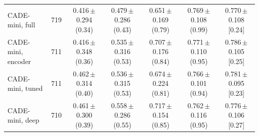 \begin{table}[t]
{\begin{tabular}{@{}lrccccc@{}}
    \midrule
    CADE-mini, full & 719 & 0.416\,{\scriptsize$\pm$0.294} {\scriptsize(0.34)} & 0.479\,{\scriptsize$\pm$0.286} {\scriptsize(0.43)} & 0.651\,{\scriptsize$\pm$0.169} {\scriptsize(0.79)} & 0.769\,{\scriptsize$\pm$0.108} {\scriptsize(0.99)} & 0.770\,{\scriptsize$\pm$0.108} {\scriptsize[0.24]} \\
    CADE-mini, encoder & 711 & 0.416\,{\scriptsize$\pm$0.348} {\scriptsize(0.36)} & 0.535\,{\scriptsize$\pm$0.316} {\scriptsize(0.53)} & 0.707\,{\scriptsize$\pm$0.176} {\scriptsize(0.84)} & 0.771\,{\scriptsize$\pm$0.110} {\scriptsize(0.95)} & 0.786\,{\scriptsize$\pm$0.105} {\scriptsize[0.25]} \\
    CADE-mini, tuned & 711 & 0.462\,{\scriptsize$\pm$0.314} {\scriptsize(0.40)} & 0.536\,{\scriptsize$\pm$0.315} {\scriptsize(0.53)} & 0.674\,{\scriptsize$\pm$0.224} {\scriptsize(0.81)} & 0.766\,{\scriptsize$\pm$0.101} {\scriptsize(0.94)} & 0.781\,{\scriptsize$\pm$0.095} {\scriptsize[0.23]} \\
    CADE-mini, deep & 710 & 0.461\,{\scriptsize$\pm$0.300} {\scriptsize(0.39)} & 0.558\,{\scriptsize$\pm$0.286} {\scriptsize(0.55)} & 0.717\,{\scriptsize$\pm$0.154} {\scriptsize(0.85)} & 0.762\,{\scriptsize$\pm$0.116} {\scriptsize(0.95)} & 0.776\,{\scriptsize$\pm$0.106} {\scriptsize[0.27]} \\
    \bottomrule
  \end{tabular}}
\end{table}
